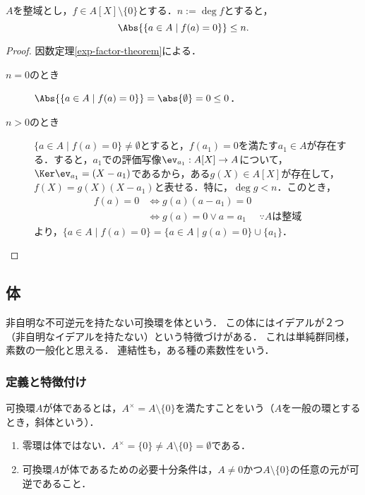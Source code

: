 \documentclass[uplatex,dvipdfmx]{jsreport}
\begin{document}
\begin{proposition}[多項式の根の数]\label{prop-roots-of-polynomials}
    $A$を整域とし，$f\in A[X]\setminus\{0\}$とする．$n:=\deg f$とすると，
    \[\Abs{\{a\in A\mid f(a)=0\}}\le n.\]
\end{proposition}
\begin{proof}
    因数定理\ref{exp-factor-theorem}による．
    \begin{description}
        \item[$n=0$のとき] $\Abs{\{a\in A\mid f(a)=0\}}=\abs{\emptyset}=0\le 0$．
        \item[$n>0$のとき] $\{a\in A\mid f(a)=0\}\ne\emptyset$とすると，$f(a_1)=0$を満たす$a_1\in A$が存在する．すると，$a_1$での評価写像$\ev_{a_1}:A[X]\to A$について，$\Ker\ev_{a_1}=(X-a_1)$であるから，ある$g(X)\in A[X]$が存在して，$f(X)=g(X)(X-a_1)$と表せる．特に，$\deg g<n$．このとき， \begin{align*}
            f(a)=0&\Leftrightarrow g(a)(a-a_1)=0\\
            &\Leftrightarrow g(a)=0\lor a=a_1&\because Aは整域
        \end{align*}
        より，$\{a\in A\mid f(a)=0\}=\{a\in A\mid g(a)=0\}\cup\{a_1\}$．
    \end{description}
\end{proof}

\subsection{体}

\begin{tcolorbox}[colframe=ForestGreen, colback=ForestGreen!10!white,breakable,colbacktitle=ForestGreen!40!white,coltitle=black,fonttitle=\bfseries\sffamily,
title=体とは素数である]
    非自明な不可逆元を持たない可換環を体という．
    この体にはイデアルが２つ（非自明なイデアルを持たない）という特徴づけがある．
    これは単純群同様，素数の一般化と思える．
    連結性も，ある種の素数性をいう．
\end{tcolorbox}

\subsubsection{定義と特徴付け}

\begin{definition}[field]
    可換環$A$が体であるとは，$A^\times=A\setminus\{0\}$を満たすことをいう（$A$を一般の環とするとき，斜体という）．
\end{definition}
\begin{remark}\mbox{}\label{remark-field}
    \begin{enumerate}
        \item 零環は体ではない．$A^\times=\{0\}\ne A\setminus\{0\}=\emptyset$である．
        \item 可換環$A$が体であるための必要十分条件は，$A\ne 0$かつ$A\setminus\{0\}$の任意の元が可逆であること．
    \end{enumerate}
\end{remark}
\end{document}
